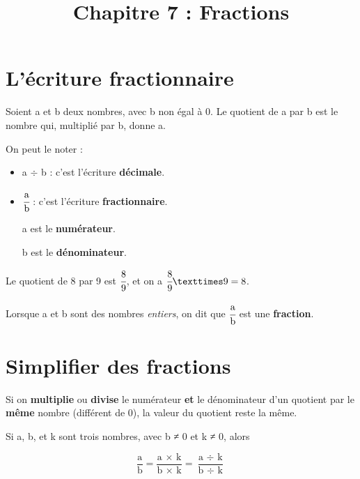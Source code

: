 \documentclass[a4paper,11pt]{article}
\title{Chapitre 7 : Fractions}
\date{}
\author{}
\begin{document}
\maketitle

\section{L'écriture fractionnaire}

\begin{cours}
	Soient a et b deux nombres, avec b non égal à 0. Le quotient de a par b est le nombre qui, multiplié par b, donne a.

	On peut le noter :
	\begin{itemize}
		\item a $÷$ b : c'est l'écriture \textbf{décimale}.
		\item $\cfrac{\text{a}}{\text{b}}$ : c'est l'écriture \textbf{fractionnaire}.

		      a est le \textbf{numérateur}.

		      b est le \textbf{dénominateur}.
	\end{itemize}
\end{cours}


\begin{exemple}
	Le quotient de 8 par 9 est $\cfrac{8}{9}$, et on a $\cfrac{8}{9} × 9 = 8$.
\end{exemple}

\begin{cours}[Fractions]
	Lorsque a et b sont des nombres \textit{entiers}, on dit que $\cfrac{\text{a}}{\text{b}}$ est une \textbf{fraction}.
\end{cours}

\section{Simplifier des fractions}

\begin{cours}
	Si on \textbf{multiplie} ou \textbf{divise} le numérateur \textbf{et} le dénominateur d'un quotient par le \textbf{même} nombre (différent de 0), la valeur du quotient reste la même.

	Si a, b, et k sont trois nombres, avec b ≠ 0 et k ≠ 0, alors

	$$ \frac{\text{a}}{\text{b}} = \frac{\text{a × k}}{\text{b × k}} = \frac{\text{a }÷\text{ k}}{\text{b }÷\text{ k}} $$
\end{cours}
\end{document}
